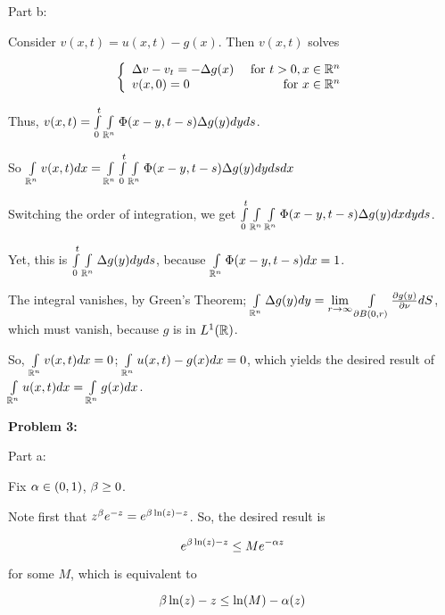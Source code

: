 \documentclass[a4paper,12pt]{article}
\begin{document}
\shunt

Part b:

Consider $v(x,t) = u(x,t) - g(x)$. Then $v(x,t)$ solves

\begin{displaymath}
   \left\{
     \begin{array}{lr}
       \Delta v -v_t  = -\Delta g(x) & \text{ for } t>0, x \in \mathbb{R}^n \\
       v(x,0) = 0 & \text{ for } x \in \mathbb{R}^n
     \end{array}
   \right.
\end{displaymath}

Thus, $v(x,t) = \int\limits_0^t \int\limits_{\mathbb{R}^n} \Phi(x-y,t-s) \Delta g(y) dy ds$.

So $\int\limits_{\mathbb{R}^n} v(x,t) dx = \int\limits_{\mathbb{R}^n} \int\limits_0^t \int\limits_{\mathbb{R}^n} \Phi(x-y,t-s) \Delta g(y) dy ds dx$

Switching the order of integration, we get $ \int\limits_0^t \int\limits_{\mathbb{R}^n} \int\limits_{\mathbb{R}^n} \Phi(x-y,t-s) \Delta g(y) dx dy ds$.

Yet, this is $ \int\limits_0^t \int\limits_{\mathbb{R}^n} \Delta g(y) dy ds$, because $\int\limits_{\mathbb{R}^n} \Phi(x-y,t-s) dx = 1$. 

The integral vanishes, by Green's Theorem; $\int\limits_{\mathbb{R}^n} \Delta g(y) dy = \lim\limits_{r \to \infty} \int\limits_{\partial B(0,r)} \frac{\partial g(y)}{\partial \nu} dS$, which must vanish, because $g$ is in $L^1(\mathbb{R})$. %

So, $\int\limits_{\mathbb{R}^n} v(x,t) dx = 0$; $\int\limits_{\mathbb{R}^n} u(x,t) - g(x) dx = 0$, which yields the desired result of $\int\limits_{\mathbb{R}^n} u(x,t) dx = \int\limits_{\mathbb{R}^n} g(x) dx$.

\shunt

{\bf Problem 3:}

Part a: %

Fix $\alpha \in (0,1)$, $\beta \geq 0$.

Note first that $z^\beta e^{-z} = e^{\beta \ln(z) - z}$. So, the desired result is

\begin{displaymath}
e^{\beta \ln(z) - z} \leq M e^{-\alpha z}
\end{displaymath}

for some $M$, which is equivalent to

\begin{displaymath}
\beta \ln(z) - z \leq \ln(M) - \alpha(z)
\end{displaymath}
\end{document}
